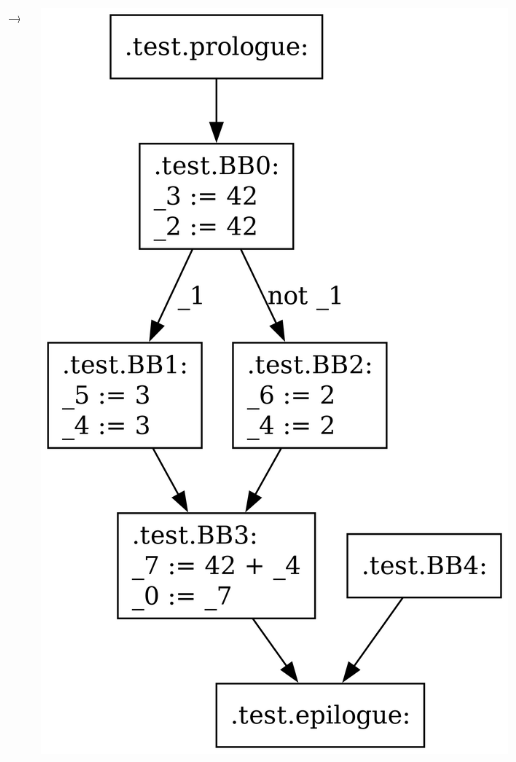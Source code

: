 \documentclass{beamer}
\begin{document}
\begin{frame}
\begin{columns}
            \pause
            \begin{column}{.04\textwidth}
                $\rightarrow$
            \end{column}
            \begin{column}{.40\textwidth}
                \includegraphics[width=\textwidth,height=0.8\textheight,keepaspectratio]{graphs/ex_propagation_after.dot.png}
            \end{column}
        \end{columns}       
\end{frame}
\end{document}
